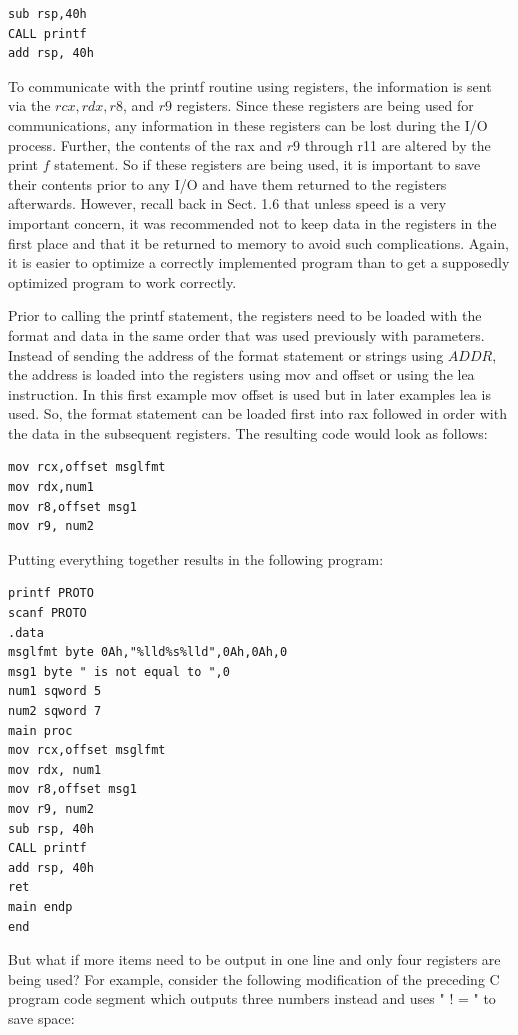 \documentclass[10pt]{book}
\begin{document}
\begin{verbatim}
sub rsp,40h
CALL printf
add rsp, 40h
\end{verbatim}

To communicate with the printf routine using registers, the information is sent via the $r c x, r d x, r 8$, and $r 9$ registers. Since these registers are being used for communications, any information in these registers can be lost during the I/O process. Further, the contents of the rax and $r 9$ through r11 are altered by the print $f$ statement. So if these registers are being used, it is important to save their contents prior to any I/O and have them returned to the registers afterwards. However, recall back in Sect. 1.6 that unless speed is a very important concern, it was recommended not to keep data in the registers in the first place and that it be returned to memory to avoid such complications. Again, it is easier to optimize a correctly implemented program than to get a supposedly optimized program to work correctly.

Prior to calling the printf statement, the registers need to be loaded with the format and data in the same order that was used previously with parameters. Instead of sending the address of the format statement or strings using $A D D R$, the address is loaded into the registers using mov and offset or using the lea instruction. In this first example mov offset is used but in later examples lea is used. So, the format statement can be loaded first into rax followed in order with the data in the subsequent registers. The resulting code would look as follows:

\begin{verbatim}
mov rcx,offset msglfmt
mov rdx,num1
mov r8,offset msg1
mov r9, num2
\end{verbatim}

Putting everything together results in the following program:

\begin{verbatim}
printf PROTO
scanf PROTO
.data
msglfmt byte 0Ah,"%lld%s%lld",0Ah,0Ah,0
msg1 byte " is not equal to ",0
num1 sqword 5
num2 sqword 7
main proc
mov rcx,offset msglfmt
mov rdx, num1
mov r8,offset msg1
mov r9, num2
sub rsp, 40h
CALL printf
add rsp, 40h
ret
main endp
end
\end{verbatim}

But what if more items need to be output in one line and only four registers are being used? For example, consider the following modification of the preceding C program code segment which outputs three numbers instead and uses " ! = " to save space:
\end{document}
